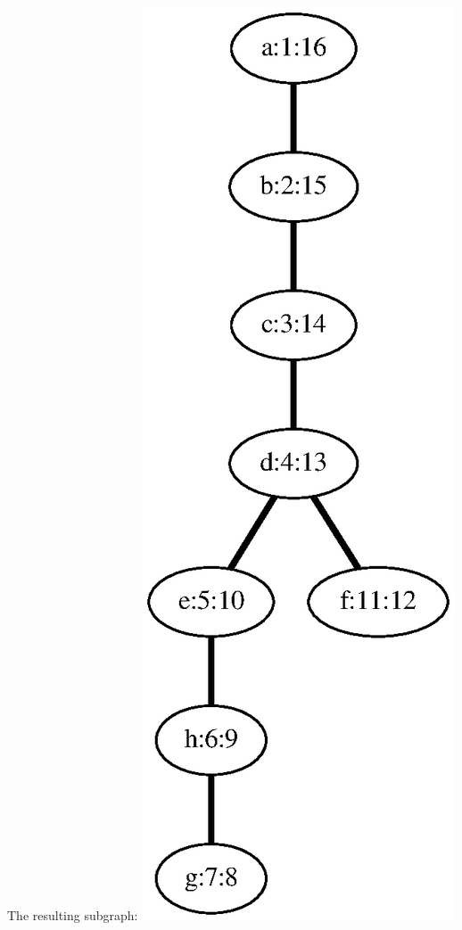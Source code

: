 \documentclass{article}
\begin{document}
\begin{minipage}[b][.25\textheight]{0.303030303030303\linewidth}
The resulting subgraph: 
\includegraphics[height=.25\textheight]{dfs_undirected_classroom_17.eps}
\end{minipage}
\end{document}
